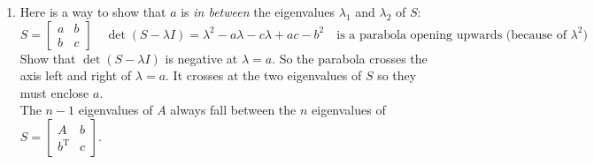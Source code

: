 \documentclass[14pt, a4paper]{article}
\begin{document}
\begin{enumerate}[resume]
    \item Here is a way to show that $a$ is \textit{in between} the eigenvalues $\lambda_1$ and $\lambda_2$ of $S$:
          \[
              S = \begin{bmatrix} a & b \\ b & c \end{bmatrix} \quad \det(S - \lambda I) = \lambda^2 - a\lambda - c\lambda + ac - b^2 \quad \text{is a parabola opening upwards (because of } \lambda^2)
          \]
          Show that $\det(S - \lambda I)$ is negative at $\lambda = a$. So the parabola crosses the axis left and right of $\lambda = a$. It crosses at the two eigenvalues of $S$ so they must enclose $a$. \\
          The $n - 1$ eigenvalues of $A$ always fall between the $n$ eigenvalues of $S = \begin{bmatrix} A & b \\ b^{\mathrm{T}} & c \end{bmatrix}$.
\end{enumerate}
\end{document}
